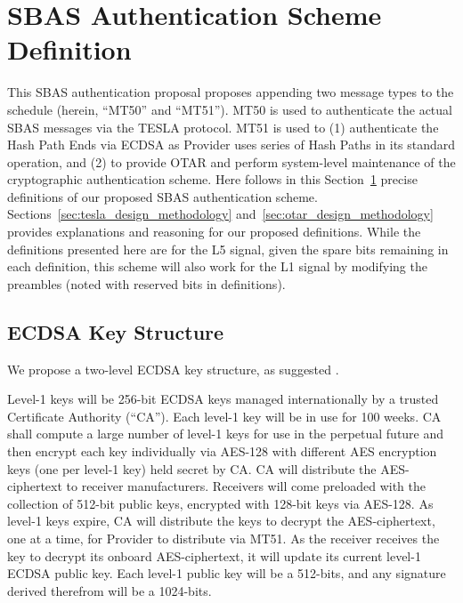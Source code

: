 \documentclass[letterpaper,times]{IONconf/IONconf}
\begin{document}
\section{SBAS Authentication Scheme Definition} \label{sec:sbas_authentication_scheme_definition}

	This SBAS authentication proposal proposes appending two message types to the schedule (herein, ``MT50'' and ``MT51'').
	MT50 is used to authenticate the actual SBAS messages via the TESLA protocol.
	MT51 is used to (1) authenticate the Hash Path Ends via ECDSA as Provider uses series of Hash Paths in its standard operation, and (2) to provide OTAR and perform system-level maintenance of the cryptographic authentication scheme.
	Here follows in this Section~\ref{sec:sbas_authentication_scheme_definition} precise definitions of our proposed SBAS authentication scheme.
	Sections~\ref{sec:tesla_design_methodology} and~\ref{sec:otar_design_methodology} provides explanations and reasoning for our proposed definitions.
	While the definitions presented here are for the L5 signal, given the spare bits remaining in each definition, this scheme will also work for the L1 signal by modifying the preambles (noted with reserved bits in definitions).

	\subsection{ECDSA Key Structure} \label{sub:ecdsa_key_structure}

		We propose a two-level ECDSA key structure, as suggested \cite{Neish_Dissertation}.

		Level-1 keys will be 256-bit ECDSA keys managed internationally by a trusted Certificate Authority (``CA'').
		Each level-1 key will be in use for 100 weeks.
		CA shall compute a large number of level-1 keys for use in the perpetual future and then encrypt each key individually via AES-128 with different AES encryption keys (one per level-1 key) held secret by CA.
		CA will distribute the AES-ciphertext to receiver manufacturers.
		Receivers will come preloaded with the collection of 512-bit public keys, encrypted with 128-bit keys via AES-128.
		As level-1 keys expire, CA will distribute the keys to decrypt the AES-ciphertext, one at a time, for Provider to distribute via MT51.
		As the receiver receives the key to decrypt its onboard AES-ciphertext, it will update its current level-1 ECDSA public key.
		Each level-1 public key will be a 512-bits, and any signature derived therefrom will be a 1024-bits.
\end{document}

